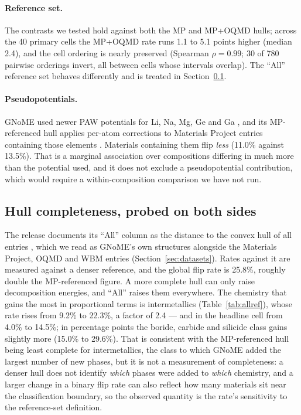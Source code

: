 \documentclass[11pt]{article}
\begin{document}
\paragraph{Reference set.} The contrasts we tested hold against both the MP and
MP+OQMD hulls; across the 40 primary cells the MP+OQMD rate runs 1.1 to 5.1 points higher
(median 2.4), and the cell ordering is nearly preserved (Spearman $\rho = 0.99$; 30 of
780 pairwise orderings invert, all between cells whose intervals overlap). The ``All'' reference set behaves differently
and is treated in Section~\ref{sec:allref}.

\paragraph{Pseudopotentials.} GNoME used newer PAW potentials for Li, Na, Mg, Ge and Ga
\citep{merchant2023}, and its MP-referenced hull applies per-atom corrections to Materials Project entries
containing those elements \citep{gnomedataset}. Materials containing them flip
\emph{less} (11.0\% against 13.5\%). That is a
marginal association over compositions differing in much more than the potential used,
and it does not exclude a pseudopotential contribution, which would require a
within-composition comparison we have not run.

\subsection{Hull completeness, probed on both sides}\label{sec:allref}

The release documents its ``All'' column as the distance to the convex hull of all
entries \citep{gnomedataset}, which we read as GNoME's own structures alongside the
Materials Project, OQMD and WBM entries (Section~\ref{sec:datasets}). Rates against it are measured against a denser
reference, and the global flip rate is 25.8\%, roughly double the MP-referenced figure.
A more complete hull can only raise decomposition energies, and ``All'' raises them
everywhere. The chemistry that gains the most in proportional terms is intermetallics
(Table~\ref{tab:allref}), whose rate rises from 9.2\% to 22.3\%, a factor of 2.4 --- and
in the headline cell from 4.0\% to 14.5\%; in percentage points the boride, carbide and
silicide class gains slightly more (15.0\% to 29.6\%). That is consistent with the
MP-referenced hull being least complete for intermetallics, the class to which GNoME
added the largest number of new phases, but it is not a measurement of completeness: a denser hull does not identify
\emph{which} phases were added to \emph{which} chemistry, and a larger change in a
binary flip rate can also reflect how many materials sit near the classification
boundary, so the observed quantity is the rate's sensitivity to the reference-set
definition.
\end{document}
